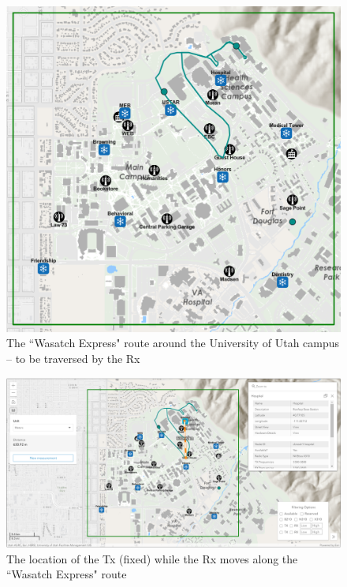 \documentclass[12pt]{article}
\newcommand{\areaofinterestfigwidth}{1.0\textwidth}
\begin{document}
\begin{itemize}
            \begin{figure}
                \centering
                \includegraphics[width=\areaofinterestfigwidth]{figs/Wasatch_Express_Route_4.png}
                \caption{The ``Wasatch Express" route around the University of Utah campus -- to be traversed by the Rx}
                \label{fig:Rx_5}
            \end{figure}
            \begin{figure}
                \centering
                \includegraphics[width=\areaofinterestfigwidth]{figs/Wasatch_Express_Route_4_Hospital_Tx.png}
                \caption{The location of the Tx (fixed) while the Rx moves along the ``Wasatch Express" route}
                \label{fig:Tx_5}
            \end{figure}

\end{itemize}
\end{document}

